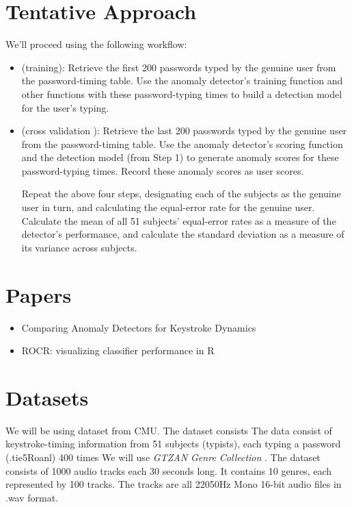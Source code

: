 \documentclass[a4paper,10pt]{article}
\begin{document}
\section{Tentative Approach}
We'll proceed using the following workflow:
\begin{itemize}

 \item(training): Retrieve the first 200 passwords typed by the genuine user from the password-timing table. Use the anomaly detector's training function\cite{doi:10.1109/DSN.2009.5270346} and other functions with these password-typing times to build a detection model for the user's typing.

 \item(cross validation ): Retrieve the last 200 passwords typed by the genuine user from the password-timing table. Use the anomaly detector's\cite{doi:10.1109/DSN.2009.5270346}  scoring function and the detection model (from Step 1) to generate anomaly scores for these password-typing times. Record these anomaly scores as user scores.

Repeat the above four steps, designating each of the subjects as the genuine user in turn, and calculating the equal-error rate for the genuine user. Calculate the mean of all 51 subjects' equal-error rates as a measure of the detector's performance, and calculate the standard deviation as a measure of its variance across subjects. 

\end{itemize}




\section{Papers}
\begin{itemize}
 \item Comparing Anomaly Detectors for Keystroke Dynamics\cite{doi:10.1109/DSN.2009.5270346}
 \item ROCR: visualizing classifier performance in R \cite{doi:10.1093/bioinformatics/bti623}
\end{itemize}

\section{Datasets}
We will be using dataset from CMU. The dataset consists The data consist of keystroke-timing information from 51 subjects (typists), each typing a password (.tie5Roanl) 400 times
We will use \textit{GTZAN Genre Collection} \cite{cmu_dataset}.
The dataset consists of 1000 audio tracks each 30 seconds long. It contains 10 genres, each represented by 100 tracks. The tracks are all 22050Hz Mono 16-bit audio files in .wav format.




\end{document}
